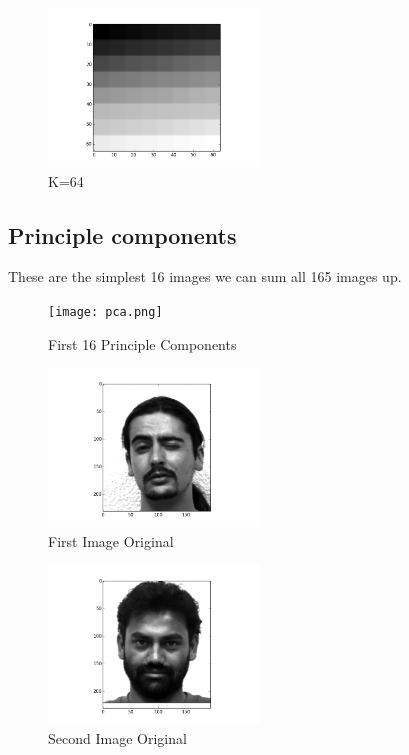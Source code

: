 \documentclass[conference]{IEEEtran}
\begin{document}
    \begin{figure}[htbp]
        \centerline{\includegraphics[width=0.5\textwidth]{64.png}}
        \caption{K=64}
        \label{k64}
    \end{figure}



    \subsection{Principle components}

    These are the simplest 16 images we can sum all 165 images up.

    \begin{figure}[htbp]
        \centerline{\texttt{[image: pca.png]}}
        \caption{First 16 Principle Components}
        \label{pca}
    \end{figure}




    \begin{figure}[htbp]
        \centerline{\includegraphics[width=0.5\textwidth]{orig-1.png}}
        \caption{First Image Original}
    \end{figure}

    \begin{figure}[htbp]
        \centerline{\includegraphics[width=0.5\textwidth]{orig-2.png}}
        \caption{Second Image Original}
    \end{figure}
\end{document}
